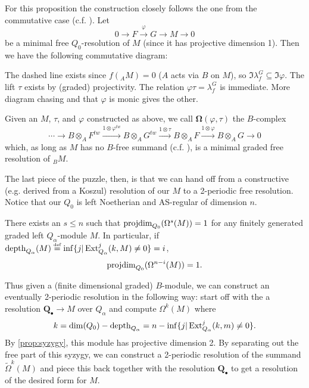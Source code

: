 \documentclass[12pt]{article}
\begin{document}
For this proposition the construction closely follows the one from the commutative case (c.f. \cite{yoshino90}). Let
\[0\to F\xrightarrow{\varphi}G\to M\to 0\]
be a minimal free $Q_0$-resolution of $M$ (since it has projective dimension 1). Then we have the following commutative diagram:
\begin{figure}[ht!]
    \centering
\end{figure}

The dashed line exists since $f(_AM)=0$ ($A$ acts via $B$ on $M$), so $\Im\lambda_f^G\subseteq\Im\varphi$. The lift $\tau$ exists by (graded) projectivity. The relation $\varphi\tau=\lambda_f^G$ is immediate. More diagram chasing and that $\varphi$ is monic gives the other.

\begin{defn}
Given an $M$, $\tau$, and $\varphi$ constructed as above, we call $\mathbf{\Omega}(\varphi,\tau)$ the $B$-complex
\[\cdots\to B\otimes_AF^{tw}\xrightarrow{1\otimes \varphi^{tw}}B\otimes_A G^{tw}\xrightarrow{1\otimes\tau} B\otimes_A F\xrightarrow{1\otimes\varphi} B\otimes_AG\to 0\]
which, as long as $M$ has no $B$-free summand (c.f. \cite[prop 2.9]{kirkman13}), is a minimal graded free resolution of $_BM$.
\end{defn}

The last piece of the puzzle, then, is that we can hand off from a constructive (e.g. derived from a Koszul) resolution of our $M$ to a 2-periodic free resolution. Notice that our $Q_0$ is left Noetherian and AS-regular of dimension $n$. 

\begin{prop}\label{prop:syzygy}
    There exists an $s\le n$ such that $\operatorname{projdim}_{Q_0}(\Omega^s(M))=1$ for any finitely generated graded left $Q_\alpha$-module $M$. In particular, if $\operatorname{depth}_{Q_\alpha}(M)\stackrel{\text{\tiny def}}{=}\inf\{j|\operatorname{Ext}^j_{Q_\alpha}(k,M)\ne0\}=i$,
    \[\operatorname{projdim}_{Q_0}(\Omega^{n-i}(M))=1.\]
\end{prop}

Thus given a (finite dimensional graded) $B$-module, we can construct an eventually 2-periodic resolution in the following way: start off with the a resolution $\mathbf{Q}_\bullet\to M$ over $Q_\alpha$ and compute $\Omega^k(M)$ where \[k=\operatorname{dim}(Q_0)-\operatorname{depth}_{Q_\alpha}=n-\inf\{j|\operatorname{Ext}_{Q_\alpha}^j(k,m)\ne 0\}.\]
By \ref{prop:syzygy}, this module has projective dimension 2. By separating out the free part of this syzygy, we can construct a 2-periodic resolution of the summand $\widetilde\Omega^k(M)$ and piece this back together with the resolution $\mathbf{Q}_\bullet$ to get a resolution of the desired form for $M$.
\end{document}

